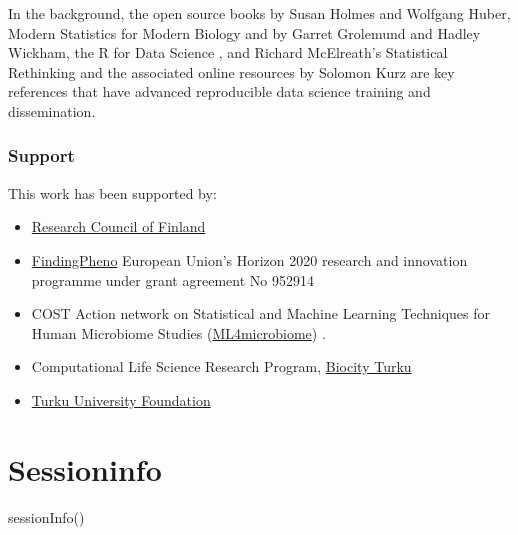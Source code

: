 \documentclass[
]{book}
\newenvironment{Shaded}{\begin{snugshade}}{\end{snugshade}}
\newcommand{\FunctionTok}[1]{\textcolor[rgb]{0.00,0.00,0.00}{#1}}
\newcommand{\NormalTok}[1]{#1}
\begin{document}
In the background, the open source books by Susan Holmes and Wolfgang
Huber, Modern Statistics for Modern Biology \citep{Holmes2019} and by
Garret Grolemund and Hadley Wickham, the R for Data Science
\citep{Grolemund2017}, and Richard McElreath's Statistical Rethinking and
the associated online resources by Solomon Kurz \citep{McElreath2020} are
key references that have advanced reproducible data science training
and dissemination.

\hypertarget{support}{%
\subsection*{Support}\label{support}}

This work has been supported by:

\begin{itemize}
\item
  \href{https://www.aka.fi/}{Research Council of Finland}
\item
  \href{https://www.findingpheno.eu/}{FindingPheno} European Union's Horizon 2020 research and innovation programme under grant agreement No 952914
\item
  COST Action network on Statistical and Machine Learning Techniques for Human Microbiome Studies
  (\href{https://www.ml4microbiome.eu/}{ML4microbiome}) \citep{MorenoIndias2021}.
\item
  Computational Life Science Research Program, \href{https://biocityturku.fi/}{Biocity Turku}
\item
  \href{https://www.yliopistosaatio.fi/en/}{Turku University Foundation}
\end{itemize}

\hypertarget{sessioninfo}{%
\chapter*{Sessioninfo}\label{sessioninfo}}

\begin{Shaded}
\begin{Highlighting}[]
\FunctionTok{sessionInfo}\NormalTok{()}
\end{Highlighting}
\end{Shaded}
\end{document}
